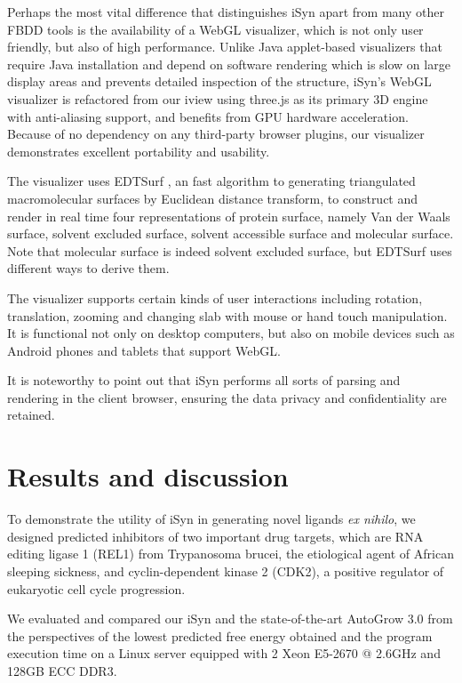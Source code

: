 Perhaps the most vital difference that distinguishes iSyn apart from many other FBDD tools is the availability of a WebGL visualizer, which is not only user friendly, but also of high performance. Unlike Java applet-based visualizers that require Java installation and depend on software rendering which is slow on large display areas and prevents detailed inspection of the structure, iSyn's WebGL visualizer is refactored from our iview \citep{1366} using three.js as its primary 3D engine with anti-aliasing support, and benefits from GPU hardware acceleration. Because of no dependency on any third-party browser plugins, our visualizer demonstrates excellent portability and usability.

The visualizer uses EDTSurf \citep{1297,1350}, an fast algorithm to generating triangulated macromolecular surfaces by Euclidean distance transform, to construct and render in real time four representations of protein surface, namely Van der Waals surface, solvent excluded surface, solvent accessible surface and molecular surface. Note that molecular surface is indeed solvent excluded surface, but EDTSurf uses different ways to derive them.

The visualizer supports certain kinds of user interactions including rotation, translation, zooming and changing slab with mouse or hand touch manipulation. It is functional not only on desktop computers, but also on mobile devices such as Android phones and tablets that support WebGL.

It is noteworthy to point out that iSyn performs all sorts of parsing and rendering in the client browser, ensuring the data privacy and confidentiality are retained.

\section{Results and discussion}

To demonstrate the utility of iSyn in generating novel ligands \textit{ex nihilo}, we designed predicted inhibitors of two important drug targets, which are RNA editing ligase 1 (REL1) from Trypanosoma brucei, the etiological agent of African sleeping sickness, and cyclin-dependent kinase 2 (CDK2), a positive regulator of eukaryotic cell cycle progression.

We evaluated and compared our iSyn and the state-of-the-art AutoGrow 3.0 from the perspectives of the lowest predicted free energy obtained and the program execution time on a Linux server equipped with 2 Xeon E5-2670 @ 2.6GHz and 128GB ECC DDR3.

